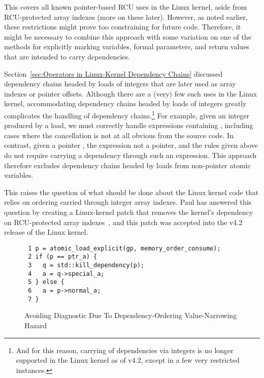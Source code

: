 \documentclass[letterpaper,twocolumn,10pt]{article}
\begin{document}
This covers all known pointer-based RCU uses in the Linux kernel,
aside from RCU-protected array indexes (more on these later).
However, as noted earlier, these restrictions might prove too constraining
for future code.
Therefore, it might be necessary to combine this approach with some
variation on one of the methods for explicitly marking variables, formal
parameters, and return values that are intended to carry dependencies.

Section~\ref{sec:Operators in Linux-Kernel Dependency Chains}
discussed dependency chains headed by
 loads of integers that are later used as
array indexes or pointer offsets.
Although there are a (very) few such uses in the Linux kernel, accommodating
dependency chains headed by loads of integers greatly complicates the
handling of dependency chains.\footnote{
	And for this reason, carrying of dependencies via integers is
	no longer supported in the Linux kernel as of v4.2, except in
	a few very restricted instances.}
For example, given an integer  produced by a 
load, we must correctly handle expressions containing , including
cases where the cancellation is not at all obvious from the source code.
In contrast, given a pointer , the expression  not a pointer,
and the rules given above do not require carrying a dependency through
such an expression.
This approach therefore excludes dependency chains headed by
 loads from non-pointer atomic variables.

This raises the question of what should be done about the Linux kernel
code that relies on ordering carried through integer array indexes.
Paul has answered this question by creating a Linux-kernel
patch that removes the kernel's dependency on RCU-protected array
indexes~\cite{PaulEMcKenney2015NoRCUArrayIndex}, and this patch
was accepted into the v4.2 release of the Linux kernel.

\begin{figure}[tbp]
{ \scriptsize
\begin{verbatim}
 1 p = atomic_load_explicit(gp, memory_order_consume);
 2 if (p == ptr_a) {
 3   q = std::kill_dependency(p);
 4   a = q->special_a;
 5 } else {
 6   a = p->normal_a;
 7 }
\end{verbatim}
}
\caption{Avoiding Diagnostic Due To Dependency-Ordering Value-Narrowing Hazard}
\label{fig:Avoiding Diagnostic Due To Dependency-Ordering Value-Narrowing Hazard}
\end{figure}
\end{document}
